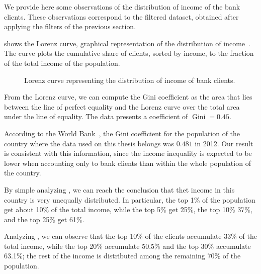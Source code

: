 We provide here some observations of the distribution of income of the bank clients. These observations correspond to the filtered dataset, obtained after applying the filters of the previous section.

 shows the Lorenz curve, graphical representation of the distribution of income~\cite{satchell1987}. The curve plots the cumulative share of clients, sorted by income, to the fraction of the total income of the population.

\begin{figure}
\centering
{}
\caption{Lorenz curve representing the distribution of income of bank clients.}
\label{fig:lorenz}
\end{figure}

From the Lorenz curve, we can compute the Gini coefficient as the area that lies between the line of perfect equality and the Lorenz curve over the total area under the line of equality. The data presents a coefficient of $\operatorname{Gini} = 0.45$.

According to the World Bank~\cite{world_bank}, the Gini coefficient for the population of the country where the data used on this thesis belongs was $0.481$ in 2012. Our result is consistent with this information, since the income inequality is expected to be lower when accounting only to bank clients than within the whole population of the country.

By simple analyzing , we can reach the conclusion that thet income in this country is very unequally distributed. In particular, the top 1\% of the population get about 10\% of the total income, while the top 5\% get 25\%, the top 10\% 37\%, and the top 25\% get 61\%.

Analyzing , we can observe that the top 10\% of the clients accumulate 33\% of the total income, while the top 20\% accumulate 50.5\% and the top 30\% accumulate 63.1\%; the rest of the income is distributed among the remaining 70\% of the population.
